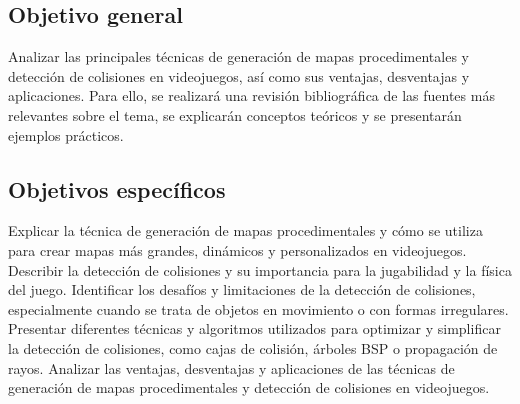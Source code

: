 \documentclass[stu, 12pt, letterpaper, donotrepeattitle, floatsintext, natbib]{apa7}
\newcommand{\myparagraph}[1]{\paragraph{#1}\mbox{}\\}
\begin{document}
\subsection{Objetivo general} 
Analizar las principales técnicas de generación de mapas procedimentales y detección de colisiones en videojuegos, así como sus ventajas, desventajas y aplicaciones. Para ello, se realizará una revisión bibliográfica de las fuentes más relevantes sobre el tema, se explicarán conceptos teóricos y se presentarán ejemplos prácticos.
\subsection{Objetivos específicos} 
Explicar la técnica de generación de mapas procedimentales y cómo se utiliza para crear mapas más grandes, dinámicos y personalizados en videojuegos.
Describir la detección de colisiones y su importancia para la jugabilidad y la física del juego.
Identificar los desafíos y limitaciones de la detección de colisiones, especialmente cuando se trata de objetos en movimiento o con formas irregulares.
Presentar diferentes técnicas y algoritmos utilizados para optimizar y simplificar la detección de colisiones, como cajas de colisión, árboles BSP o propagación de rayos.
Analizar las ventajas, desventajas y aplicaciones de las técnicas de generación de mapas procedimentales y detección de colisiones en videojuegos.

\newpage
\renewcommand\refname{\large\textbf{Referencias}}

\end{document}
